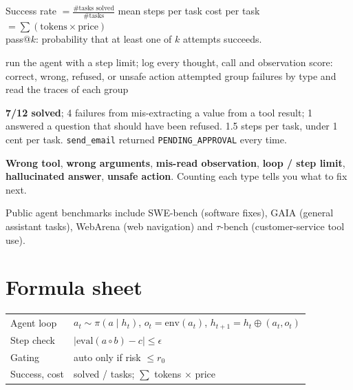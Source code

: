 \documentclass[11pt,a4paper]{article}
\begin{document}

\begin{bmath}
Success rate $=\frac{\#\text{tasks solved}}{\#\text{tasks}}$ \quad mean steps per task \quad cost per task $=\sum(\text{tokens}\times\text{price})$\\[2pt]
pass@$k$: probability that at least one of $k$ attempts succeeds.
\end{bmath}
\begin{balgo}
\begin{algorithmic}[1]
  \State run the agent with a step limit; log every thought, call and observation
  \State score: correct, wrong, refused, or unsafe action attempted
\EndFor
\State group failures by type and read the traces of each group
\end{algorithmic}
\end{balgo}
\begin{bres}
\textbf{7/12 solved}; 4 failures from mis-extracting a value from a tool result; 1 answered a question that should have been refused. 1.5 steps per task, under 1 cent per task. \texttt{send\_email} returned \texttt{PENDING\_APPROVAL} every time.
\end{bres}
\begin{bdef}
\textbf{Wrong tool}, \textbf{wrong arguments}, \textbf{mis-read observation}, \textbf{loop / step limit}, \textbf{hallucinated answer}, \textbf{unsafe action}. Counting each type tells you what to fix next.
\end{bdef}
\begin{bapp}
Public agent benchmarks include SWE-bench (software fixes), GAIA (general assistant tasks), WebArena (web navigation) and $\tau$-bench (customer-service tool use).
\end{bapp}

\section*{Formula sheet}
\begin{tabularx}{\linewidth}{@{}l X@{}}
\toprule
Agent loop & $a_t\sim\pi(a\mid h_t)$, $o_t=\mathrm{env}(a_t)$, $h_{t+1}=h_t\oplus(a_t,o_t)$\\
Step check & $|\mathrm{eval}(a\circ b)-c|\le\epsilon$\\
Gating & auto only if risk $\le r_0$\\
Success, cost & solved / tasks; \; $\sum$ tokens $\times$ price\\
\bottomrule
\end{tabularx}
\end{document}
